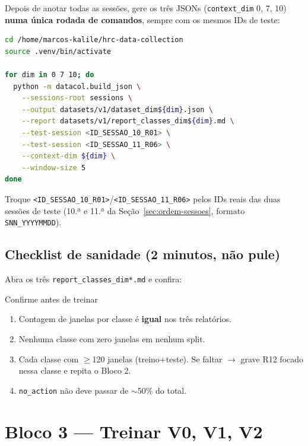 \documentclass[11pt,a4paper]{article}
\begin{document}
Depois de anotar todas as sessões, gere os três JSONs (\texttt{context\_dim}
0, 7, 10) \textbf{numa única rodada de comandos}, sempre com os mesmos IDs
de teste:

\begin{lstlisting}[language=bash]
cd /home/marcos-kalile/hrc-data-collection
source .venv/bin/activate

for dim in 0 7 10; do
  python -m datacol.build_json \
    --sessions-root sessions \
    --output datasets/v1/dataset_dim${dim}.json \
    --report datasets/v1/report_classes_dim${dim}.md \
    --test-session <ID_SESSAO_10_R01> \
    --test-session <ID_SESSAO_11_R06> \
    --context-dim ${dim} \
    --window-size 5
done
\end{lstlisting}

Troque \texttt{<ID\_SESSAO\_10\_R01>}/\texttt{<ID\_SESSAO\_11\_R06>} pelos
IDs reais das duas sessões de teste (10.ª e 11.ª da
Seção~\ref{sec:ordem-sessoes}, formato \texttt{SNN\_YYYYMMDD}).

\subsection{Checklist de sanidade (2 minutos, não pule)}
\label{sec:sanidade}

Abra os três \texttt{report\_classes\_dim*.md} e confira:

\begin{stepbox}{Confirme antes de treinar}
\begin{enumerate}[leftmargin=1.5em]
  \item Contagem de janelas por classe é \textbf{igual} nos três relatórios.
  \item Nenhuma classe com zero janelas em nenhum split.
  \item Cada classe com $\geq$120 janelas (treino+teste). Se faltar $\to$ grave R12 focado nessa classe e repita o Bloco 2.
  \item \texttt{no\_action} não deve passar de $\sim$50\% do total.
\end{enumerate}
\end{stepbox}

\section{Bloco 3 --- Treinar V0, V1, V2}
\label{sec:treino}
\end{document}
